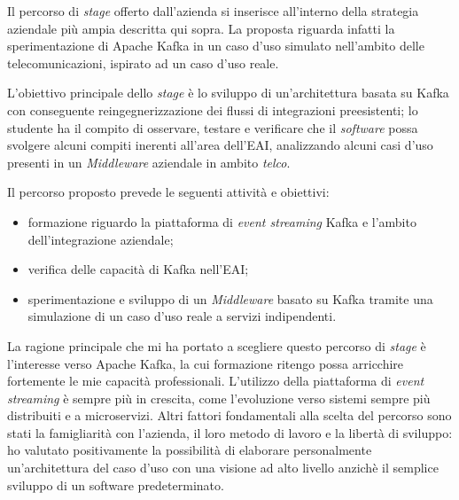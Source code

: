 Il percorso di \textit{stage} offerto dall'azienda si inserisce all'interno della strategia aziendale più ampia descritta qui sopra.
La proposta riguarda infatti la sperimentazione di Apache Kafka in un caso d'uso simulato nell'ambito delle telecomunicazioni, ispirato ad un caso d'uso reale.

L'obiettivo principale dello \textit{stage} è lo sviluppo di un'architettura basata su Kafka con conseguente reingegnerizzazione dei flussi di integrazioni preesistenti; lo studente ha il compito di osservare, testare e verificare che il \textit{software} possa svolgere alcuni compiti inerenti all'area dell'EAI, analizzando alcuni casi d'uso presenti in un \textit{Middleware} aziendale in ambito \textit{telco}.

\bigskip\noindent
Il percorso proposto prevede le seguenti attività e obiettivi:
\begin{itemize}
  \item formazione riguardo la piattaforma di \textit{event streaming} Kafka e l'ambito dell'integrazione aziendale;
  \item verifica delle capacità di Kafka nell'EAI;
  \item sperimentazione e sviluppo di un \textit{Middleware} basato su Kafka tramite una simulazione di un caso d'uso reale a servizi indipendenti.
\end{itemize}

La ragione principale che mi ha portato a scegliere questo percorso di \textit{stage} è l'interesse verso Apache Kafka, la cui formazione ritengo possa arricchire fortemente le mie capacità professionali.
L'utilizzo della piattaforma di \textit{event streaming} è sempre più in crescita, come l'evoluzione verso sistemi sempre più distribuiti e a microservizi.
Altri fattori fondamentali alla scelta del percorso sono stati la famigliarità con l'azienda, il loro metodo di lavoro e la libertà di sviluppo: ho valutato positivamente la possibilità di elaborare personalmente un'architettura del caso d'uso con una visione ad alto livello anzichè il semplice sviluppo di un software predeterminato.
